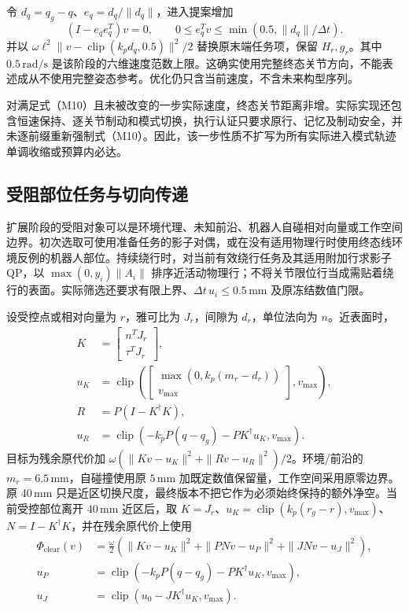 令 $d_q=q_g-q$、$e_q=d_q/\|d_q\|$，进入提案增加
\begin{equation}
 (I-e_qe_q^T)v=0,\qquad
 0\le e_q^Tv\le\min(0.5,\|d_q\|/\Delta t).\tag{M10}
\end{equation}
并以 $\omega\ell^2\|v-\operatorname{clip}(k_p d_q,0.5)\|^2/2$ 替换原末端任务项，保留 $H_r,g_r$。其中 $0.5\,\mathrm{rad/s}$ 是该阶段的六维速度范数上限。这确实使用完整终态关节方向，不能表述成从不使用完整姿态参考。优化仍只含当前速度，不含未来构型序列。

对满足式（M10）且未被改变的一步实际速度，终态关节距离非增。实际实现还包含恒速保持、逐关节制动和模式切换，执行认证只要求原行、记忆及制动安全，并未逐前缀重新强制式（M10）。因此，该一步性质不扩写为所有实际进入模式轨迹单调收缩或预算内必达。

\subsection{受阻部位任务与切向传递}
扩展阶段的受阻对象可以是环境代理、未知前沿、机器人自碰相对向量或工作空间边界。初次选取可使用准备任务的影子对偶，或在没有适用物理行时使用终态线环境反例的机器人部位。持续绕行时，对当前有效绕行任务及其适用附加行求影子 QP，以 $\max(0,y_i)\|A_i\|$ 排序近活动物理行；不将关节限位行当成需贴着绕行的表面。实际筛选还要求有限上界、$\Delta t\,u_i\le0.5\,\mathrm{mm}$ 及原冻结数值门限。

设受控点或相对向量为 $r$，雅可比为 $J_r$，间隙为 $d_r$，单位法向为 $n$。近表面时，
\begin{equation}
\begin{aligned}
 K&=\begin{bmatrix}n^TJ_r\\\tau^TJ_r\end{bmatrix},\\
 u_K&=\operatorname{clip}\!\left(\begin{bmatrix}\max(0,k_p(m_r-d_r))\\v_{\max}\end{bmatrix},v_{\max}\right),\\
 R&=P(I-K^\dagger K),\\
 u_R&=\operatorname{clip}(-k_pP(q-q_g)-PK^\dagger u_K,v_{\max}).
\end{aligned}\tag{M11}
\end{equation}
目标为残余原代价加 $\omega(\|Kv-u_K\|^2+\|Rv-u_R\|^2)/2$。环境/前沿的 $m_r=6.5\,\mathrm{mm}$，自碰撞使用原 $5\,\mathrm{mm}$ 加既定数值保留量，工作空间采用原零边界。原 $40\,\mathrm{mm}$ 只是近区切换尺度，最终版本不把它作为必须始终保持的额外净空。当前受控部位离开 $40\,\mathrm{mm}$ 近区后，取 $K=J_r$、$u_K=\operatorname{clip}(k_p(r_g-r),v_{\max})$、$N=I-K^\dagger K$，并在残余原代价上使用
\begin{equation}
\begin{aligned}
 \Phi_{\mathrm{clear}}(v)&=\tfrac\omega2\left(\|Kv-u_K\|^2+\|PNv-u_P\|^2+\|JNv-u_J\|^2\right),\\
 u_P&=\operatorname{clip}(-k_pP(q-q_g)-PK^\dagger u_K,v_{\max}),\\
 u_J&=\operatorname{clip}(u_0-JK^\dagger u_K,v_{\max}).
\end{aligned}\tag{M11b}
\end{equation}

